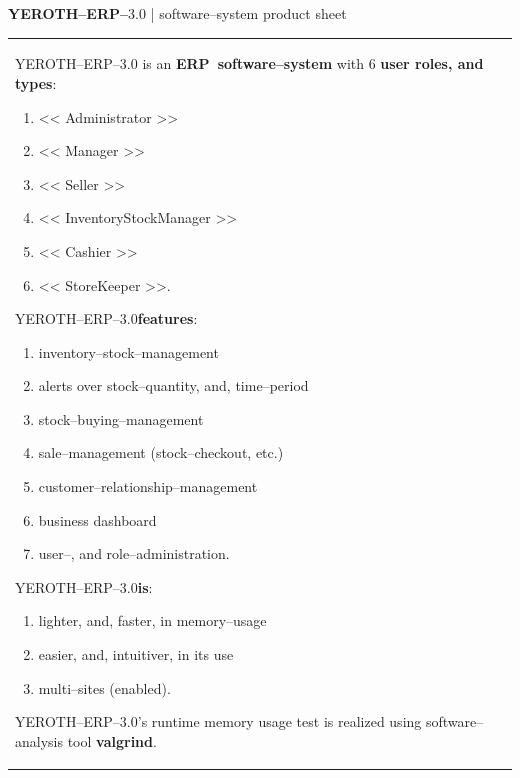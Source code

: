 \documentclass[12pt, a4paper]{article}
\newcommand{\yerenpos}{\textcolor{yerenColorBlue}{\sc YEROTH--ERP--$3.0$}\xspace}
\newcommand{\pos}{ERP~software--system\xspace}
\newcommand{\admin}{<< Administrator >>\xspace}
\newcommand{\manager}{<< Manager >>\xspace}
\newcommand{\seller}{<< Seller >>\xspace}
\newcommand{\inventorystockmanager}{<< InventoryStockManager >>\xspace}
\newcommand{\storekeeper}{<< StoreKeeper >>\xspace}
\newcommand{\cashier}{<< Cashier >>\xspace}
\begin{document}
{\bf \LARGE \yerenpos} {| \sc \scriptsize software--system product sheet }

\vspace{3.75em}

\begin{table}[!htbp]
\begin{tabular}{ll}
\parbox{27em}{

\yerenpos is an \textbf{\pos} with $6$ \textbf{user roles, and types}:
\vspace{0.1em}
\begin{enumerate}
	\item \admin
	\item \manager
	\item \seller
	\item \inventorystockmanager
	\item \cashier
	\item \storekeeper.\\
\end{enumerate}

\yerenpos \textbf{features}:
\vspace{0.1em}
\begin{enumerate}
	\item inventory--stock--management
	\item alerts over stock--quantity, and, time--period	
	\item stock--buying--management
	\item sale--management (stock--checkout, etc.)
	\item customer--relationship--management
	\item business dashboard
	\item user--, and role--administration.\\
\end{enumerate}

\yerenpos \textbf{is}:
\vspace{0.1em}
\begin{enumerate}
	\item lighter, and, faster, in memory--usage
	\item easier, and, intuitiver, in its use
	\item multi--sites (enabled).\\
\end{enumerate}

\vspace{0.5em}

\yerenpos's runtime memory usage test is realized
using software--analysis tool \textbf{valgrind}.\\
}


\end{tabular}
\end{table}
\end{document}
